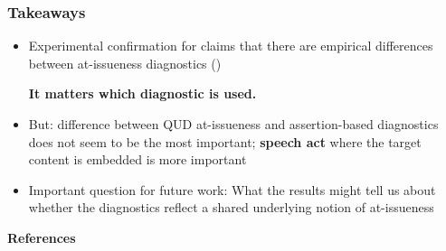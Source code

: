 \documentclass[compress, xcolor = dvipsnames, aspectratio=169, handout]{beamer}
\begin{document}
	\begin{frame}\frametitle{Takeaways}
	
		\begin{itemize}[<+->]
			\item Experimental confirmation for claims that there are empirical differences between at-issueness diagnostics (\citealt{snider_anaphoric_2017,snider_at-issueness_2017,snider_distinguishing_2018,koev_notions_2018,faller_discourse_2019,korotkova_evidential_2020})
			\begin{center}
				\textbf{It matters which diagnostic is used.}\bigskip
			\end{center}


			\item But: difference between QUD at-issueness and assertion-based diagnostics does not seem to be the most important; \textbf{speech act} where the target content is embedded is more important \medskip


			\item Important question for future work: What the results might tell us about whether the diagnostics reflect a shared underlying notion of at-issueness
		\end{itemize}

	
	\end{frame}



\begin{frame}[allowframebreaks]{\bfseries\opt References}
	\footnotesize
	
	

\end{frame}
\end{document}
